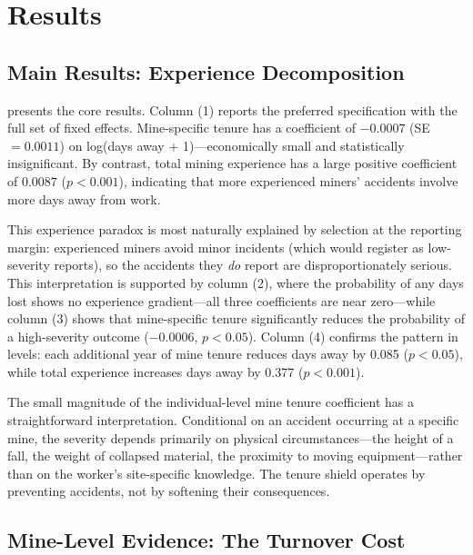 \documentclass[12pt]{article}
\begin{document}
\section{Results}\label{sec:results}

\subsection{Main Results: Experience Decomposition}



 presents the core results. Column (1) reports the preferred specification with the full set of fixed effects. Mine-specific tenure has a coefficient of $-0.0007$ (SE $= 0.0011$) on log(days away $+$ 1)---economically small and statistically insignificant. By contrast, total mining experience has a large positive coefficient of $0.0087$ ($p < 0.001$), indicating that more experienced miners' accidents involve more days away from work.

This experience paradox is most naturally explained by selection at the reporting margin: experienced miners avoid minor incidents (which would register as low-severity reports), so the accidents they \textit{do} report are disproportionately serious. This interpretation is supported by column (2), where the probability of any days lost shows no experience gradient---all three coefficients are near zero---while column (3) shows that mine-specific tenure significantly reduces the probability of a high-severity outcome ($-0.0006$, $p < 0.05$). Column (4) confirms the pattern in levels: each additional year of mine tenure reduces days away by 0.085 ($p < 0.05$), while total experience increases days away by 0.377 ($p < 0.001$).

The small magnitude of the individual-level mine tenure coefficient has a straightforward interpretation. Conditional on an accident occurring at a specific mine, the severity depends primarily on physical circumstances---the height of a fall, the weight of collapsed material, the proximity to moving equipment---rather than on the worker's site-specific knowledge. The tenure shield operates by preventing accidents, not by softening their consequences.

\subsection{Mine-Level Evidence: The Turnover Cost}
\end{document}
